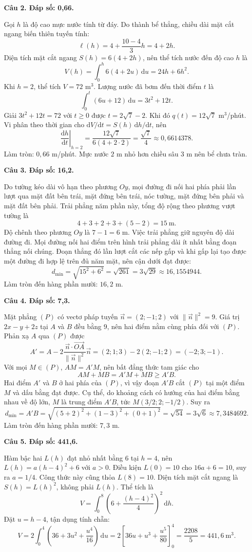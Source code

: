 \documentclass[12pt,a4paper]{article}
\newcommand{\loigiai}[1]{\par\medskip\Needspace{4\baselineskip}\noindent\textbf{#1}\par\nobreak}
\begin{document}
\loigiai{Câu 2. Đáp số: 0,66.}
Gọi $h$ là độ cao mực nước tính từ đáy. Do thành bể thẳng, chiều dài mặt cắt ngang biến thiên tuyến tính:
\[
\ell(h)=4+\frac{10-4}{3}h=4+2h.
\]
Diện tích mặt cắt ngang $S(h)=6(4+2h)$, nên thể tích nước đến độ cao $h$ là
\[
V(h)=\int_0^h6(4+2u)\,\mathrm du=24h+6h^2.
\]
Khi $h=2$, thể tích $V=72$ m$^3$. Lượng nước đã bơm đến thời điểm $t$ là
\[
\int_0^t(6u+12)\,\mathrm du=3t^2+12t.
\]
Giải $3t^2+12t=72$ với $t\geq0$ được $t=2\sqrt7-2$. Khi đó $q(t)=12\sqrt7$ m$^3$/phút. Vi phân theo thời gian cho $\mathrm dV/\mathrm dt=S(h)\,\mathrm dh/\mathrm dt$, nên
\[
\left.\frac{\mathrm dh}{\mathrm dt}\right|_{h=2}
=\frac{12\sqrt7}{6(4+2\cdot2)}=\frac{\sqrt7}{4}
\approx0{,}6614378.
\]
Làm tròn: $0{,}66$ m/phút. Mực nước $2$ m nhỏ hơn chiều sâu $3$ m nên bể chưa tràn.

\loigiai{Câu 3. Đáp số: 16,2.}
Do tường kéo dài vô hạn theo phương $Oy$, mọi đường đi nối hai phía phải lần lượt qua mặt đất bên trái, mặt đứng bên trái, nóc tường, mặt đứng bên phải và mặt đất bên phải. Trải phẳng năm phần này, tổng độ rộng theo phương vượt tường là
\[
4+3+2+3+(5-2)=15\ \text{m}.
\]
Độ chênh theo phương $Oy$ là $7-1=6$ m. Việc trải phẳng giữ nguyên độ dài đường đi. Mọi đường nối hai điểm trên hình trải phẳng dài ít nhất bằng đoạn thẳng nối chúng. Đoạn thẳng đó lần lượt cắt các nếp gấp và khi gấp lại tạo được một đường đi hợp lệ trên đủ năm mặt, nên cận dưới đạt được:
\[
d_{\min}=\sqrt{15^2+6^2}=\sqrt{261}=3\sqrt{29}\approx16{,}1554944.
\]
Làm tròn đến hàng phần mười: $16{,}2$ m.

\loigiai{Câu 4. Đáp số: 7,3.}
Mặt phẳng $(P)$ có vectơ pháp tuyến $\vec n=(2;-1;2)$ với $\|\vec n\|^2=9$. Giá trị $2x-y+2z$ tại $A$ và $B$ đều bằng $9$, nên hai điểm nằm cùng phía đối với $(P)$.
Phản xạ $A$ qua $(P)$ được
\[
A'=A-2\frac{\vec n\cdot\overrightarrow{OA}}{\|\vec n\|^2}\vec n
=(2;1;3)-2(2;-1;2)=(-2;3;-1).
\]
Với mọi $M\in(P)$, $AM=A'M$, nên bất đẳng thức tam giác cho
\[
AM+MB=A'M+MB\geq A'B.
\]
Hai điểm $A'$ và $B$ ở hai phía của $(P)$, vì vậy đoạn $A'B$ cắt $(P)$ tại một điểm $M$ và dấu bằng đạt được. Cụ thể, do khoảng cách có hướng của hai điểm bằng nhau về độ lớn, $M$ là trung điểm $A'B$, tức $M(3/2;2;-1/2)$. Suy ra
\[
d_{\min}=A'B=\sqrt{(5+2)^2+(1-3)^2+(0+1)^2}
=\sqrt{54}=3\sqrt6\approx7{,}3484692.
\]
Làm tròn đến hàng phần mười: $7{,}3$ m.

\loigiai{Câu 5. Đáp số: 441,6.}
Hàm bậc hai $L(h)$ đạt nhỏ nhất bằng $6$ tại $h=4$, nên $L(h)=a(h-4)^2+6$ với $a>0$. Điều kiện $L(0)=10$ cho $16a+6=10$, suy ra $a=1/4$. Công thức này cũng thỏa $L(8)=10$.
Diện tích mặt cắt ngang là $S(h)=L(h)^2$, không phải $L(h)$. Thể tích là
\[
V=\int_0^8\left(6+\frac{(h-4)^2}{4}\right)^2\,\mathrm dh.
\]
Đặt $u=h-4$, tận dụng tính chẵn:
\[
V=2\int_0^4\left(36+3u^2+\frac{u^4}{16}\right)\,\mathrm du
=2\left[36u+u^3+\frac{u^5}{80}\right]_0^4
=\frac{2208}{5}=441{,}6\ \mathrm m^3.
\]
\end{document}
